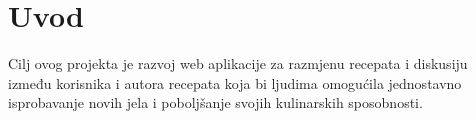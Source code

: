 	


		
		
		
		
		
		
		\section{Uvod}
		Cilj ovog projekta je razvoj web aplikacije za razmjenu recepata i diskusiju između korisnika i autora recepata koja bi ljudima omogućila jednostavno isprobavanje novih jela i poboljšanje svojih kulinarskih sposobnosti.
